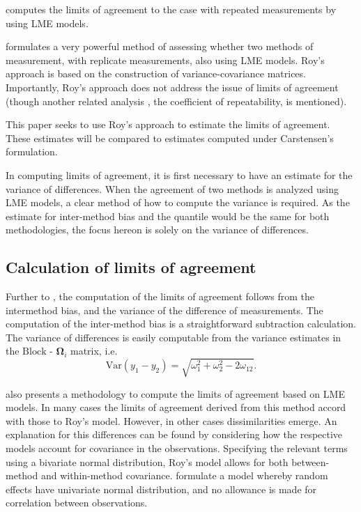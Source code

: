 \documentclass[12pt, a4paper]{report}
\theoremstyle{plain}
\theoremstyle{definition}
\theoremstyle{remark}
\begin{document}
			\citet{BXC2008} computes the limits of agreement to the case with repeated measurements by using LME models.
			
			\citet{ARoy2009} formulates a very powerful method of assessing whether two methods of measurement, with replicate measurements, also using LME models. Roy's approach is based on the construction of variance-covariance matrices.
			Importantly, Roy's approach does not address the issue of limits of agreement (though another related analysis , the coefficient of repeatability, is mentioned).
			
			This paper seeks to use Roy's approach to estimate the limits of agreement. These estimates will be compared to estimates computed under Carstensen's formulation.
			
			In computing limits of agreement, it is first necessary to have an estimate for the variance of differences. When the agreement of two methods is analyzed using LME models, a clear method of how to compute the variance is required. As the estimate for inter-method bias and the quantile would be the same for both methodologies, the focus hereon is solely on the variance of differences.

	
	
	
	

	
	
	
	\subsection{Calculation of limits of agreement }
	
	
	Further to \citet{BA86}, the computation of the limits of agreement follows from the intermethod bias, and the variance of the difference of measurements. The computation of the inter-method bias is a straightforward subtraction calculation. The variance of differences is easily computable from the variance estimates in the ${\mbox{Block - }\boldsymbol \Omega_{i}}$ matrix, i.e.
	\[
	\mathrm{Var}(y_1 - y_2) = \sqrt{ \omega^2_1 + \omega^2_2 - 2\omega_{12}}.
	\]
	
	\citet{BXC2008} also presents a methodology to compute the limits of agreement based on LME models. In many cases the limits of agreement derived from this method accord with those to Roy's model. However, in other cases dissimilarities emerge. An explanation for this differences can be found by considering how the respective models account for covariance in the observations. Specifying the relevant terms using a bivariate normal distribution, Roy's model allows for both between-method and within-method covariance. \citet{BXC2008} formulate a model whereby random effects have univariate normal distribution, and no allowance is made for correlation between observations.
	
\end{document}
